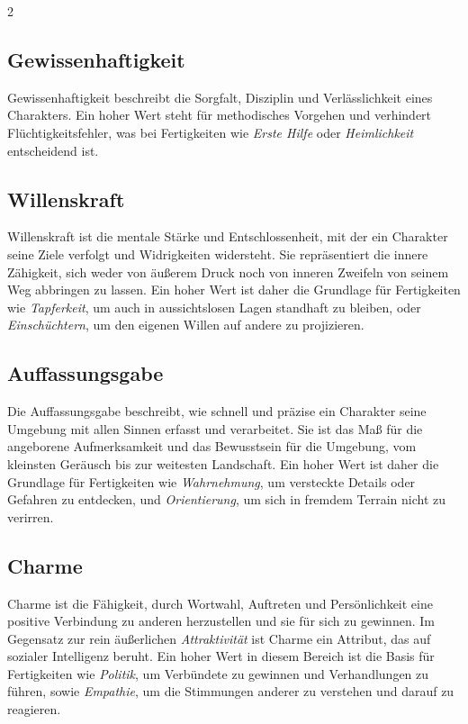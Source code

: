 \begin{multicols}{2}
\subsection{Gewissenhaftigkeit}

Gewissenhaftigkeit beschreibt die Sorgfalt, Disziplin und Verlässlichkeit eines Charakters. Ein hoher Wert steht für methodisches Vorgehen und verhindert Flüchtigkeitsfehler, was bei Fertigkeiten wie \textit{Erste Hilfe} oder \textit{Heimlichkeit} entscheidend ist.

\subsection{Willenskraft}

Willenskraft ist die mentale Stärke und Entschlossenheit, mit der ein Charakter seine Ziele verfolgt und Widrigkeiten widersteht. Sie repräsentiert die innere Zähigkeit, sich weder von äußerem Druck noch von inneren Zweifeln von seinem Weg abbringen zu lassen. Ein hoher Wert ist daher die Grundlage für Fertigkeiten wie \textit{Tapferkeit}, um auch in aussichtslosen Lagen standhaft zu bleiben, oder \textit{Einschüchtern}, um den eigenen Willen auf andere zu projizieren.

\subsection{Auffassungsgabe}

Die Auffassungsgabe beschreibt, wie schnell und präzise ein Charakter seine Umgebung mit allen Sinnen erfasst und verarbeitet. Sie ist das Maß für die angeborene Aufmerksamkeit und das Bewusstsein für die Umgebung, vom kleinsten Geräusch bis zur weitesten Landschaft. Ein hoher Wert ist daher die Grundlage für Fertigkeiten wie \textit{Wahrnehmung}, um versteckte Details oder Gefahren zu entdecken, und \textit{Orientierung}, um sich in fremdem Terrain nicht zu verirren.

\subsection{Charme}

Charme ist die Fähigkeit, durch Wortwahl, Auftreten und Persönlichkeit eine positive Verbindung zu anderen herzustellen und sie für sich zu gewinnen. Im Gegensatz zur rein äußerlichen \textit{Attraktivität} ist Charme ein Attribut, das auf sozialer Intelligenz beruht. Ein hoher Wert in diesem Bereich ist die Basis für Fertigkeiten wie \textit{Politik}, um Verbündete zu gewinnen und Verhandlungen zu führen, sowie \textit{Empathie}, um die Stimmungen anderer zu verstehen und darauf zu reagieren.


\end{multicols}
